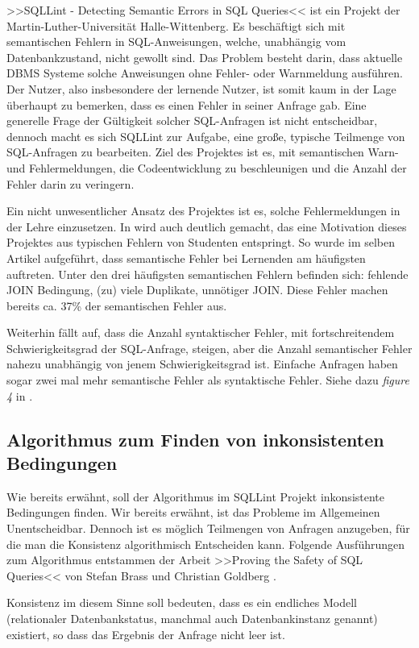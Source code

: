 >>SQLLint - Detecting Semantic Errors in SQL Queries<< ist ein Projekt der Martin-Luther-Universität Halle-Wittenberg. Es beschäftigt sich mit semantischen Fehlern in SQL-Anweisungen, welche, unabhängig vom Datenbankzustand, nicht gewollt sind. Das Problem besteht darin, dass aktuelle DBMS Systeme solche Anweisungen ohne Fehler- oder Warnmeldung ausführen. Der Nutzer, also insbesondere der lernende Nutzer, ist somit kaum in der Lage überhaupt zu bemerken, dass es einen Fehler in seiner Anfrage gab. Eine generelle Frage der Gültigkeit solcher SQL-Anfragen ist nicht entscheidbar, dennoch macht es sich SQLLint zur Aufgabe, eine große, typische Teilmenge von SQL-Anfragen zu bearbeiten. Ziel des Projektes ist es, mit semantischen Warn- und Fehlermeldungen, die Codeentwicklung zu beschleunigen und die Anzahl der Fehler darin zu veringern.

Ein nicht unwesentlicher Ansatz des Projektes ist es, solche Fehlermeldungen in der Lehre einzusetzen. In \cite{sqllint1} wird auch deutlich gemacht, das eine Motivation dieses Projektes aus typischen Fehlern von Studenten entspringt. So wurde im selben Artikel aufgeführt, dass semantische Fehler bei Lernenden am häufigsten auftreten. Unter den drei häufigsten semantischen Fehlern befinden sich: fehlende JOIN Bedingung, (zu) viele Duplikate, unnötiger JOIN. Diese Fehler machen bereits ca. 37\% der semantischen Fehler aus.

Weiterhin fällt auf, dass die Anzahl syntaktischer Fehler, mit fortschreitendem Schwierigkeitsgrad der SQL-Anfrage, steigen, aber die Anzahl semantischer Fehler nahezu unabhängig von jenem Schwierigkeitsgrad ist. Einfache Anfragen haben sogar zwei mal mehr semantische Fehler als syntaktische Fehler. Siehe dazu \emph{figure 4} in \cite{sqllint1}.

\subsection{Algorithmus zum Finden von inkonsistenten Bedingungen}

Wie bereits erwähnt, soll der Algorithmus im SQLLint Projekt inkonsistente Bedingungen finden. Wir bereits erwähnt, ist das Probleme im Allgemeinen Unentscheidbar. Dennoch ist es möglich Teilmengen von Anfragen anzugeben, für die man die Konsistenz algorithmisch Entscheiden kann. Folgende Ausführungen zum Algorithmus entstammen der Arbeit >>Proving the Safety of SQL Queries<< von Stefan Brass und Christian Goldberg \cite{brass1}.

Konsistenz im diesem Sinne soll bedeuten, dass es ein endliches Modell (relationaler Datenbankstatus, manchmal auch Datenbankinstanz genannt) existiert, so dass das Ergebnis der Anfrage nicht leer ist.

